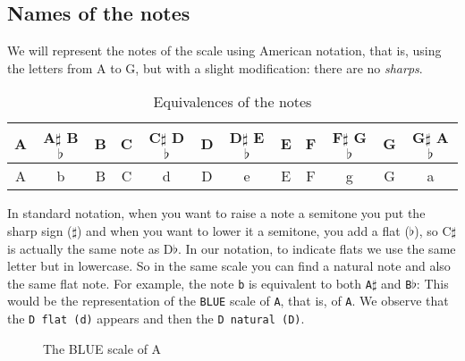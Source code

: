 \documentclass[]{report}
\begin{document}
\subsection{Names of the notes}
We will represent the notes of the scale using American notation, that is, using the letters from A to G, but with a slight modification: there are no \emph{sharps}.
\begin{table}[htbp]
\centering
\begingroup
\sffamily
\begin{tabular}{*{12}{c}}
\toprule
A & A$\sharp$ B$\flat$ & B & C & C$\sharp$ D$\flat$ & D & D$\sharp$ E$\flat$ & E & F & F$\sharp$ G$\flat$ & G & G$\sharp$ A$\flat$ \\
\midrule
A & b & B & C & d & D & e & E & F & g & G & a \\
\bottomrule
\end{tabular}
\endgroup
\caption{Equivalences of the notes}\label{tab:note-equivalences}
\end{table}
In standard notation, when you want to raise a note a semitone you put the sharp sign ($\sharp$) and when you want to lower it a semitone, you add a flat ($\flat$), so C$\sharp$ is actually the same note as D$\flat$.
In our notation, to indicate flats we use the same letter but in lowercase. So in the same scale you can find a natural note and also the same flat note. For example, the note \texttt{b} is equivalent to both \texttt{A$\sharp$} and \texttt{B$\flat$}:
This would be the representation of the \texttt{BLUE} scale of \texttt{A}, that is, of \texttt{A}. We observe that the \texttt{D flat\ (d)} appears and then the \texttt{D natural\ (D)}.
\begin{figure}[h]
\centering
{}
\vspace{12pt}
\caption{The BLUE scale of A}\label{fig:blue-scale-of-a}
\end{figure}
\end{document}
